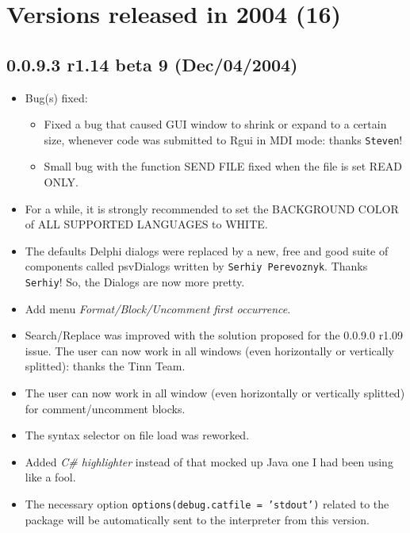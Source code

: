 
\section{Versions released in 2004 (16)}
\subsection*{0.0.9.3 r1.14 beta 9 (Dec/04/2004)}
\begin{itemize}
  \item Bug(s) fixed:
    \begin{itemize}
      \item Fixed a bug that caused \RR{} GUI window to shrink or expand to a certain size,
        whenever code was submitted to Rgui in MDI mode: thanks \texttt{Steven}!
      \item Small bug with the function SEND FILE fixed when the file is set READ ONLY.
    \end{itemize}
  \item For a while, it is strongly recommended to set the BACKGROUND COLOR of ALL SUPPORTED LANGUAGES to WHITE.
  \item The defaults Delphi dialogs were replaced by a new, free and good suite of components called psvDialogs
    written by \texttt{Serhiy Perevoznyk}. Thanks \texttt{Serhiy}! So, the Dialogs are now more pretty.
  \item Add menu \textit{Format/Block/Uncomment first occurrence}.
  \item Search/Replace was improved with the solution proposed for the 0.0.9.0 r1.09 issue. The user can now work
    in all windows (even horizontally or vertically splitted): thanks the Tinn Team.
  \item The user can now work in all window (even horizontally or vertically splitted) for comment/uncomment blocks.
  \item The syntax selector on file load was reworked.
  \item Added \textit{C\# highlighter} instead of that mocked up Java one I had been using like a fool.
  \item The necessary option \texttt{options(debug.catfile = 'stdout')} related to the package 
   will be automatically sent to the \RR{} interpreter from this version.
\end{itemize}


